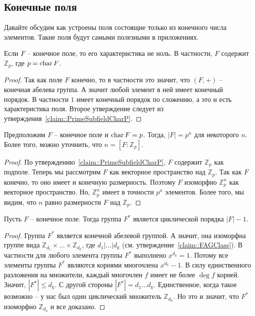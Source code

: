 \subsection{Конечные поля}

Давайте обсудим как устроены поля состоящие только из конечного числа элементов.
Такие поля будут самыми полезными в приложениях.

\begin{claim}
Если $F$ -- конечное поле, то его характеристика не ноль.
В частности, $F$ содержит $\mathbb Z_p$, где $p = \operatorname{char} F$.
\end{claim}
\begin{proof}
Так как поле $F$ конечно, то в частности это значит, что $(F, +)$ -- конечная абелева группа.
А значит любой элемент в ней имеет конечный порядок.
В частности $1$ имеет конечный порядок по сложению, а это и есть характеристика поля.
Второе утверждение следует из утверждения~\ref{claim::PrimeSubfieldCharP}.
\end{proof}

\begin{claim}
Предположим $F$ -- конечное поле и $\operatorname{char} F = p$.
Тогда, $|F| = p^n$ для некоторого $n$.
Более того, можно уточнить, что $n = [F:\mathbb Z_p]$.
\end{claim}
\begin{proof}
По утверждению~\ref{claim::PrimeSubfieldCharP}, $F$ содержит $\mathbb Z_p$ как подполе.
Теперь мы рассмотрим $F$ как векторное пространство над $\mathbb Z_p$.
Так как $F$ конечно, то оно имеет и конечную размерность.
Поэтому $F$ изоморфно $\mathbb Z_p^n$ как векторное пространство.
Но, $\mathbb Z_p^n$ имеет в точности $p^n$ элементов.
Более того, мы видим, что $n$ равно размерности $F$ над $\mathbb Z_p$.
\end{proof}

\begin{claim}
Пусть $F$ -- конечное поле.
Тогда группа $F^*$ является циклической порядка $|F| - 1$.
\end{claim}
\begin{proof}
Группа $F^*$ является конечной абелевой группой.
А значит, она изоморфна группе вида $\mathbb Z_{d_1}\times \ldots \times \mathbb Z_{d_k}$, где $d_1|\ldots |d_k$ (см. утверждение~\ref{claim::FAGClass}).
В частности для любого элемента группы $F^*$ выполнено $x^{d_k} = 1$.
Потому все элементы группы $F^*$ являются корнями многочлена $x^{d_k}-1$.
В силу единственного разложения на множители, каждый многочлен $f$ имеет не более $\deg f$ корней.
Значит, $|F^*|\leqslant d_k$.
С другой стороны $|F^*| = d_1\ldots d_k$.
Единственное, когда такое возможно -- у нас был один циклический множитель $\mathbb Z_{d_k}$.
Но это и значит, что $F^*$ изоморфно $\mathbb Z_{d_k}$ и все доказано.
\end{proof}

